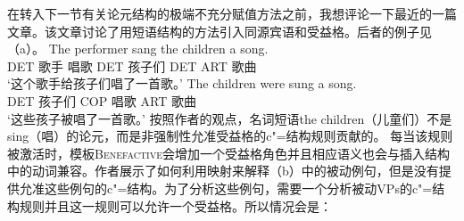     在转入下一节有关论元结构的极端不充分赋值方法之前，我想评论一下\citet*{AGT2014a}最近的一篇文章。该文章讨论了用短语结构的方法引入同源宾语和受益格。后者的例子见（a）。
\eal
\ex 
\gll The performer sang the children a song.\\
     DET 歌手 唱歌 DET 孩子们 DET ART 歌曲\\
\glt `这个歌手给孩子们唱了一首歌。'
\ex 
\gll The children were sung a song.\\
     DET 孩子们 COP 唱歌 ART 歌曲\\
\glt `这些孩子被唱了一首歌。'
\zl
按照作者的观点，名词短语the children（儿童们）不是sing（唱）的论元，而是非强制性允准受益格的c"=结构规则贡献的。
\ea\label{c-struc-vp-benefactive}
\z
每当该规则被激活时，模板\textsc{Benefactive}会增加一个受益格角色并且相应语义也会与插入结构中的动词兼容。作者展示了如何利用映射来解释（b）中的被动例句，但是没有提供允准这些例句的c"=结构。为了分析这些例句，需要一个分析被动VPs的c"=结构规则并且这一规则可以允许一个受益格。所以情况会是：
